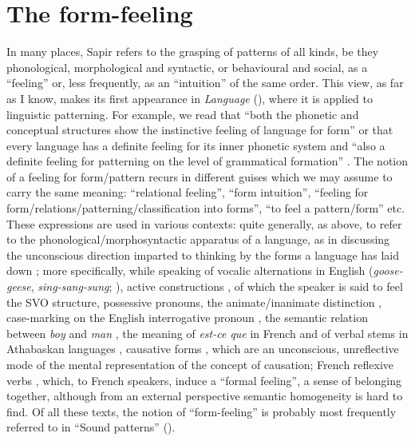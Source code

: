 \documentclass[output=paper]{langscibook}
\begin{document}
\section{The form-feeling}
\label{sec:fortis:form-feeling}

In many places, Sapir refers to the grasping of patterns of all kinds, be they phonological, morphological and syntactic, or behavioural and social, as a ``feeling'' or, less frequently, as an ``intuition'' of the same order. This view, as far as I know, makes its first appearance in \emph{Language} (\citeyear{Sapir1921}), where it is applied to linguistic patterning. For example, we read that ``both the phonetic and conceptual structures show the instinctive feeling of language for form'' \citep[56]{Sapir1921} or that every language has a definite feeling for its inner phonetic system and ``also a definite feeling for patterning on the level of grammatical formation'' \citep[61]{Sapir1921}. The notion of a feeling for form/pattern recurs in different guises which we may assume to carry the same meaning: ``relational feeling'', ``form intuition'', ``feeling for form/relations/patterning/classification into forms'', ``to feel a pattern/form'' etc. These expressions are used in various contexts: quite generally, as above, to refer to the phonological/morphosyntactic apparatus of a language, as in discussing the unconscious direction imparted to thinking by the forms a language has laid down \citep[153]{Sapir1924}; more specifically, while speaking of vocalic alternations in English (\emph{goose-geese}, \emph{sing-sang-sung}; \citealt[60--61]{Sapir1921}), active constructions \citep[84--85, 111]{Sapir1921}, of which the speaker is said to feel the SVO structure, possessive pronouns, the animate/inanimate distinction \citep[156]{Sapir1921}, case-marking on the English interrogative pronoun \citep[159]{Sapir1921}, the semantic relation between \emph{boy} and \emph{man} \citep[61]{Sapir1929b}, the meaning of \emph{est-ce que} in French and of verbal stems in Athabaskan languages \citep[147]{Sapir1923}, causative forms \citep[154]{Sapir1924}, which are an unconscious, unreflective mode of the mental representation of the concept of causation;  French reflexive verbs \citep[116]{Sapir1931}, which, to French speakers, induce a ``formal feeling'', a sense of belonging together, although from an external perspective semantic homogeneity is hard to find. Of all these texts, the notion of ``form-feeling'' is probably most frequently referred to in ``Sound patterns'' (\citeyear{Sapir1925}).
\end{document}
